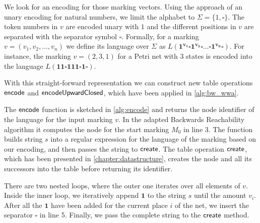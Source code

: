 \par 

We look for an encoding for those marking vectors. Using the approach of an unary encoding for natural numbers, we limit the alphabet to $\Sigma = \{1,\square\}$. The token numbers in $v$ are encoded unary with $1$ and the different positions in $v$ are separated with the separator symbol $\square$.
Formally, for a marking $v = (v_{1},v_{2},\dots,v_{n})$ we define its language over $\Sigma$ as $L(\bm{1^{v_{1}} \square 1^{v_{2}} \square ... \square 1^{v_{n}} \square })$. For instance, the marking $v = (2,3,1)$ for a Petri net with 3 states is encoded into the language $L(\bm{11 \square 111 \square 1 \square})$. 
\par 
With this straight-forward representation we can construct new table operations $\operatorname{\textsf{encode}}$ and $\operatorname{\textsf{encodeUpwardClosed}}$, which have been applied in \autoref{alg:bw_wwa}. 
\par
The $\operatorname{\textsf{encode}}$ function is sketched in \autoref{alg:encode} and returns the node identifier of the language for the input marking $v$. In the adapted Backwards Reachability algorithm it computes the node for the start marking $M_{0}$ in line 3. The function builds string $s$ into a regular expression for the language of the marking based on our encoding, and then passes the string to $\operatorname{\textsf{create}}$. The table operation $\operatorname{\textsf{create}}$, which has been presented in \autoref{chapter:datastructure}, creates the node and all its successors into the table before returning its identifier.

\par
There are two nested loops, where the outer one iterates over all elements of $v$. Inside the inner loop, we iteratively append $\bm{1}$ to the string $s$ until the amount $v_{i}$. After all the $\bm{1}$ have been added for the current place $i$ of the net, we insert the separator $\square$ in line 5.
Finally, we pass the complete string to the $\operatorname{\textsf{create}}$ method. 

